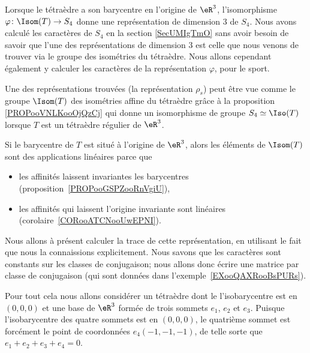 \begin{normaltext}
	Lorsque le tétraèdre a son barycentre en l'origine de \( \eR^3\), l'isomorphisme \( \varphi\colon \Isom(T)\to S_4\) donne une représentation de dimension \( 3\) de \( S_4\). Nous avons calculé les caractères de \( S_4\) en la section \ref{SecUMIgTmO} sans avoir besoin de savoir que l'une des représentations de dimension \( 3\) est celle que nous venons de trouver via le groupe des isométries du tétraèdre. Nous allons cependant également y calculer les caractères de la représentation \( \varphi\), pour le sport.
\end{normaltext}

Une des représentations trouvées (la représentation \( \rho_s\)) peut être vue comme le groupe \( \Isom(T)\) des isométries affine du tétraèdre grâce à la proposition \ref{PROPooVNLKooOjQzCj} qui donne un isomorphisme de groupe \( S_4\simeq \Iso(T)\) lorsque \( T\) est un tétraèdre régulier de \( \eR^3\).

Si le barycentre de \( T\) est situé à l'origine de \( \eR^3\), alors les éléments de \( \Isom(T)\) sont des applications linéaires parce que
\begin{itemize}
	\item les affinités laissent invariantes les barycentres (proposition~\ref{PROPooGSPZooRnVgiU}),
	\item les affinités qui laissent l'origine invariante sont linéaires (corolaire~\ref{CORooATCNooUwEPNI}).
\end{itemize}
Nous allons à présent calculer la trace de cette représentation, en utilisant le fait que nous la connaissions explicitement. Nous savons que les caractères sont constants sur les classes de conjugaison; nous allons donc écrire une matrice par classe de conjugaison (qui sont données dans l'exemple~\ref{EXooQAXRooBsPURs}).

Pour tout cela nous allons considérer un tétraèdre dont le l'isobarycentre est en \( (0,0,0)\) et une base de \( \eR^3\) formée de trois sommets \( e_1\), \( e_2\) et \( e_3\). Puisque l'isobarycentre des quatre sommets est en \( (0,0,0)\), le quatrième sommet est forcément le point de coordonnées \( e_4(-1,-1,-1)\), de telle sorte que \( e_1+e_2+e_3+e_4=0\).

